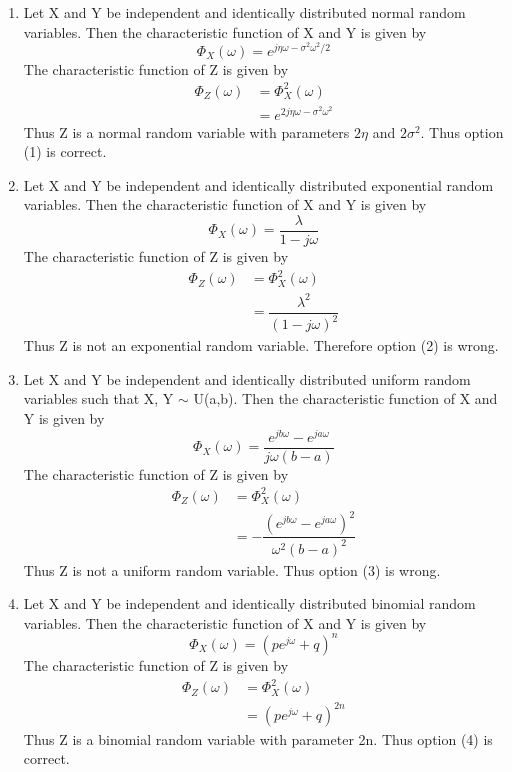 

\begin{enumerate}[label = \arabic*)]
    \item Let X and Y be independent and identically distributed normal random variables. Then the characteristic function of X and Y is given by
    \begin{equation}
        \Phi_X(\omega) = e^{j\eta\omega - \sigma^2\omega^2/2}
    \end{equation}
    The characteristic function of Z is given by
    \begin{align}
        \Phi_Z(\omega) &= \Phi_X^2(\omega)\\
                       &= e^{2j\eta\omega - \sigma^2\omega^2}
    \end{align}
    Thus Z is a normal random variable with parameters $2\eta$ and $2\sigma^2$. Thus option (1) is correct.
    \item Let X and Y be independent and identically distributed exponential random variables. Then the characteristic function of X and Y is given by
    \begin{equation}
        \Phi_X(\omega) = \dfrac{\lambda}{1-j\omega}
    \end{equation}
    The characteristic function of Z is given by
    \begin{align}
        \Phi_Z(\omega) &= \Phi_X^2(\omega)\\
                       &= \dfrac{\lambda^2}{(1-j\omega)^2}
    \end{align}
    Thus Z is not an exponential random variable. Therefore option (2) is wrong.
    \item Let X and Y be independent and identically distributed uniform random variables such that X, Y $\sim$ U(a,b). Then the characteristic function of X and Y is given by
    \begin{equation}
        \Phi_X(\omega) = \dfrac{e^{jb\omega} - e^{ja\omega}}{j\omega(b-a)}
    \end{equation}
    The characteristic function of Z is given by
    \begin{align}
        \Phi_Z(\omega) &= \Phi_X^2(\omega)\\
                       &= -\dfrac{(e^{jb\omega} - e^{ja\omega})^2}{\omega^2(b-a)^2}
    \end{align}
    Thus Z is not a uniform random variable. Thus option (3) is wrong.
    \item Let X and Y be independent and identically distributed binomial random variables. Then the characteristic function of X and Y is given by
    \begin{equation}
        \Phi_X(\omega) = (pe^{j\omega}+q)^n
    \end{equation}
    The characteristic function of Z is given by
    \begin{align}
        \Phi_Z(\omega) &= \Phi_X^2(\omega)\\
                       &= (pe^{j\omega}+q)^{2n}
    \end{align}
    Thus Z is a binomial random variable with parameter 2n. Thus option (4) is correct.
\end{enumerate}
